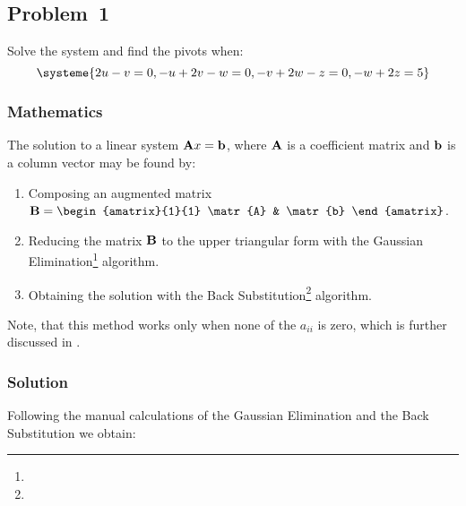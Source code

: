 \subsection{Problem~1}%
\label{sec:problem_1}

Solve the system and find the pivots when:
\begin{equation*}
    \systeme{2u-v=0,-u+2v-w=0,-v+2w-z=0,-w+2z=5}
\end{equation*}

\subsubsection*{Mathematics}
The solution to a linear system $\mathbf{A}x = \mathbf{b}$, where $\mathbf{A}$ is a
coefficient matrix and $\mathbf{b}$ is a column vector may be found by:
\begin{enumerate}
  \item Composing an augmented matrix
    $\matr{B} = \begin{amatrix}{1}{1}
      \matr{A} & \matr{b}
    \end{amatrix}$.
  \item Reducing the matrix $\mathbf{B}$ to the upper triangular form with the Gaussian
    Elimination\footnote{} algorithm.
  \item Obtaining the solution with the Back
    Substitution\footnote{} algorithm.
\end{enumerate}

Note, that this method works only when none of the $a_{ii}$ is zero, which is further
discussed in .

\subsubsection*{Solution}

Following the manual calculations of the Gaussian Elimination and the Back Substitution
we obtain:

